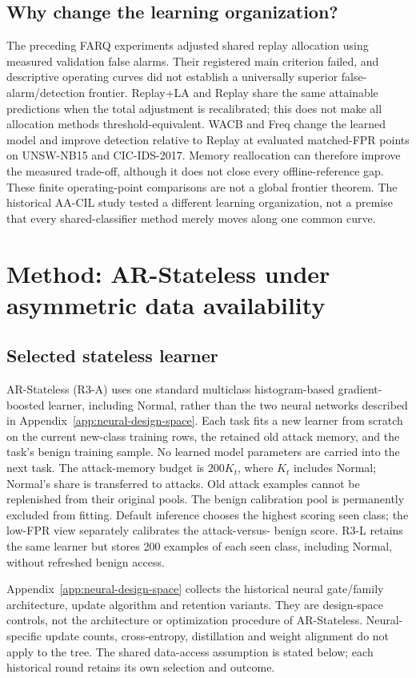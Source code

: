 \documentclass[10pt,twocolumn]{article}
\begin{document}
\subsection{Why change the learning organization?}
The preceding FARQ experiments adjusted shared replay allocation using measured validation false alarms. Their registered main criterion failed, and descriptive operating curves did not establish a universally superior false-alarm/detection frontier. Replay+LA and Replay share the same attainable predictions when the total adjustment is recalibrated; this does not make all allocation methods threshold-equivalent. WACB and Freq change the learned model and improve detection relative to Replay at evaluated matched-FPR points on UNSW-NB15 and CIC-IDS-2017. Memory reallocation can therefore improve the measured trade-off, although it does not close every offline-reference gap. These finite operating-point comparisons are not a global frontier theorem. The historical AA-CIL study tested a different learning organization, not a premise that every shared-classifier method merely moves along one common curve.

\section{Method: AR-Stateless under asymmetric data availability}
\subsection{Selected stateless learner}
AR-Stateless (R3-A) uses one standard multiclass histogram-based
gradient-boosted learner, including Normal, rather than the two neural
networks described in Appendix~\ref{app:neural-design-space}. Each task fits a new learner from scratch on the
current new-class training rows, the retained old attack memory, and the
task's benign training sample. No learned model parameters are carried into
the next task. The attack-memory budget is $200K_t$, where $K_t$ includes
Normal; Normal's share is transferred to attacks. Old attack examples cannot
be replenished from their original pools. The benign calibration pool is
permanently excluded from fitting. Default inference chooses the highest
scoring seen class; the low-FPR view separately calibrates the attack-versus-
benign score. R3-L retains the same learner but stores 200 examples of each
seen class, including Normal, without refreshed benign access.

Appendix~\ref{app:neural-design-space} collects the historical neural
gate/family architecture, update algorithm and retention variants. They are
design-space controls, not the architecture or optimization procedure of
AR-Stateless. Neural-specific update counts, cross-entropy, distillation and
weight alignment do not apply to the tree. The shared data-access assumption
is stated below; each historical round retains its own selection and outcome.
\end{document}
